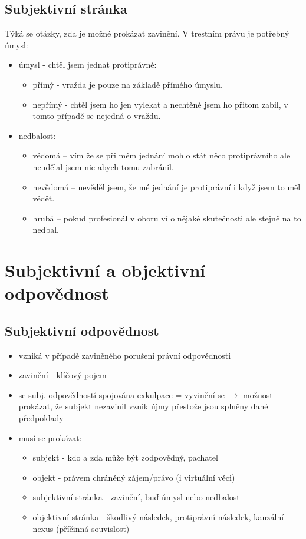 \subsection*{Subjektivní stránka}
Týká se otázky, zda je možné prokázat zavinění. V trestním právu je potřebný úmysl:
\begin{itemize}
        \item úmysl - chtěl jsem jednat protiprávně:
        \begin{itemize}
             \item přímý - vražda je pouze na základě přímého úmyslu.
            \item nepřímý - chtěl jsem ho jen vylekat a nechtěně jsem ho přitom zabil, v tomto případě se nejedná o vraždu.
        \end{itemize}
        \item nedbalost:
        \begin{itemize}
            \item vědomá -- vím že se při mém jednání mohlo stát něco protiprávního ale neudělal jsem nic abych tomu zabránil.
            \item nevědomá -- nevěděl jsem, že mé jednání je protiprávní i když jsem to měl vědět.
            \item hrubá -- pokud profesionál v oboru ví o nějaké skutečnosti ale stejně na to nedbal.
        \end{itemize}
    \end{itemize}

\clearpage
\section{Subjektivní a objektivní odpovědnost}
\subsection*{Subjektivní odpovědnost}
\begin{itemize}
    \item vzniká v případě zaviněného porušení právní odpovědnosti
    \item zavinění - klíčový pojem
    \item se subj. odpovědností spojována exkulpace = vyvinění se $\longrightarrow$ možnost prokázat, že subjekt nezavinil vznik újmy přestože jsou splněny dané předpoklady
    \item musí se prokázat:
    \begin{itemize}
        \item subjekt - kdo a zda může být zodpovědný, pachatel
        \item objekt - právem chráněný zájem/právo (i virtuální věci)
        \item subjektivní stránka - zavinění, buď úmysl nebo nedbalost
        \item objektivní stránka - škodlivý následek, protiprávní následek, kauzální nexus (příčinná souvislost)
    \end{itemize}
\end{itemize}


